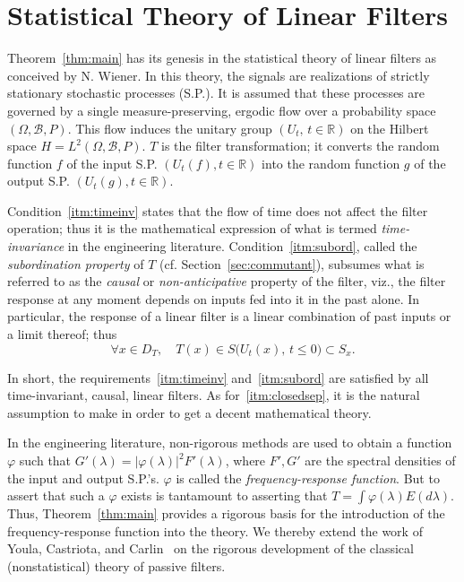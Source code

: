 \documentclass[12pt]{article}
\theoremstyle{definition}
\begin{document}
\section{Statistical Theory of Linear Filters}

Theorem~\ref{thm:main} has its genesis in the statistical theory of linear filters as conceived by N. Wiener. In this theory, the signals are realizations of strictly stationary stochastic processes (S.P.). It is assumed that these processes are governed by a single measure-preserving, ergodic flow over a probability space $(\Omega, \mathcal{B}, P)$. This flow induces the unitary group $(U_t,\, t\in\mathbb{R})$ on the Hilbert space $H = L^2(\Omega, \mathcal{B}, P)$. $T$ is the filter transformation; it converts the random function $f$ of the input S.P. $(U_t(f), t\in\mathbb{R})$ into the random function $g$ of the output S.P. $(U_t(g), t\in\mathbb{R})$. 

Condition~\ref{itm:timeinv} states that the flow of time does not affect the filter operation; thus it is the mathematical expression of what is termed \emph{time-invariance} in the engineering literature. Condition~\ref{itm:subord}, called the \emph{subordination property} of $T$ (cf. Section~\ref{sec:commutant}), subsumes what is referred to as the \emph{causal} or \emph{non-anticipative} property of the filter, viz., the filter response at any moment depends on inputs fed into it in the past alone. In particular, the response of a linear filter is a linear combination of past inputs or a limit thereof; thus
\begin{equation}
\forall x\in D_T, \quad T(x) \in S\big(U_t(x),\, t \leq 0\big) \subset S_x.
\label{eq:causal}
\end{equation}

In short, the requirements~\ref{itm:timeinv} and~\ref{itm:subord} are satisfied by all time-invariant, causal, linear filters. As for~\ref{itm:closedsep}, it is the natural assumption to make in order to get a decent mathematical theory.

In the engineering literature, non-rigorous methods are used to obtain a function $\varphi$ such that $G'(\lambda) = |\varphi(\lambda)|^2 F'(\lambda)$, where $F', G'$ are the spectral densities of the input and output S.P.'s. $\varphi$ is called the \emph{frequency-response function}. But to assert that such a $\varphi$ exists is tantamount to asserting that $T = \int \varphi(\lambda) E(d\lambda)$. Thus, Theorem~\ref{thm:main} provides a rigorous basis for the introduction of the frequency-response function into the theory. We thereby extend the work of Youla, Castriota, and Carlin~\cite{youla1959} on the rigorous development of the classical (nonstatistical) theory of passive filters.
\end{document}
